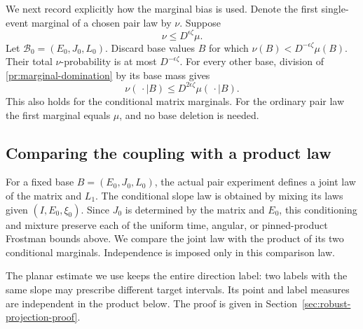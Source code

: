 We next record explicitly how the marginal bias is used. Denote
the first single-event marginal of a chosen pair law by $\nu$.
Suppose
\begin{equation}
 \nu\le D^{\epsilon\zeta}\mu.
\label{pr:marginal-domination}
\end{equation}
Let $\mathcal B_0=(E_0,J_0,L_0)$.
Discard base values $B$ for which
$\nu(B)<D^{-\epsilon\zeta}\mu(B)$.
Their total $\nu$-probability is at most $D^{-\epsilon\zeta}$.
For every other base, division of
\eqref{pr:marginal-domination} by its base mass gives
\begin{equation}
 \nu(\,\cdot\mid B)
       \le D^{2\epsilon\zeta}\mu(\,\cdot\mid B).
\label{pr:conditional-domination}
\end{equation}
This also holds for the conditional matrix marginals.
For the ordinary pair law the first marginal equals
$\mu$, and no base deletion is needed.

\subsection{Comparing the coupling with a product law}

For a fixed base $B=(E_0,J_0,L_0)$, the actual pair experiment
defines a joint law of the matrix and $L_1$.
The conditional slope law is obtained by mixing its laws given
$(I,E_0,\xi_0)$. Since $J_0$ is determined by the matrix and
$E_0$, this conditioning and mixture preserve each of the uniform
time, angular, or pinned-product Frostman bounds above.
We compare the joint law with the product of its two conditional
marginals. Independence is imposed only in this comparison law.

The planar estimate we use keeps the entire direction label: two
labels with the same slope may prescribe different target intervals.
Its point and label measures are independent in the product below.
The proof is given in Section~\ref{sec:robust-projection-proof}.


